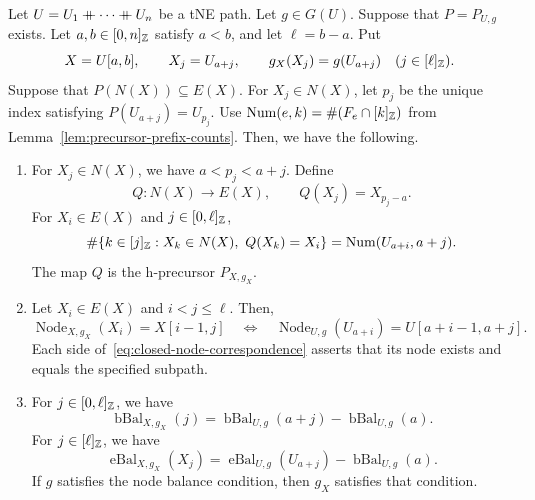 \begin{lemma}\label{lem:precursor-closed-restriction}
Let $U=U_1\mathbin{+\mkern-10mu+}\cdots\mathbin{+\mkern-10mu+} U_n$ be a tNE path. Let $g\in G(U)$. Suppose that
$P=P_{U,g}$ exists. Let $a,b\in[0,n]_{\mathbb Z}$ satisfy $a<b$, and let $\ell=b-a$. Put
\[
 X=U[a,b],\qquad X_j=U_{a+j},\qquad g_X(X_j)=g(U_{a+j})
 \quad(j\in[\ell]_{\mathbb Z}).
\]
Suppose that $P(N(X))\subseteq E(X)$.
For $X_j\in N(X)$, let $p_j$ be the unique index satisfying
$P(U_{a+j})=U_{p_j}$.
Use $\operatorname{Num}(e,k)=\#(F_e\cap[k]_{\mathbb Z})$ from Lemma~\ref{lem:precursor-prefix-counts}.
Then, we have the following.
\begin{enumerate}
\item\label{c:closed-prefix-count} For $X_j\in N(X)$, we have $a<p_j<a+j$.
Define
\[
 Q\colon N(X)\longrightarrow E(X),\qquad Q(X_j)=X_{p_j-a}.
\]
For $X_i\in E(X)$ and $j\in[0,\ell]_{\mathbb Z}$,
\[
 \#\{k\in[j]_{\Z}:X_k\in N(X),\ Q(X_k)=X_i\}=\operatorname{Num}(U_{a+i},a+j).
\]
The map $Q$ is the h-precursor $P_{X,g_X}$.
\item\label{c:closed-node-correspondence} Let $X_i\in E(X)$ and $i<j\le\ell$.
Then, \begin{equation}\label{eq:closed-node-correspondence}
 \operatorname{Node}_{X,g_X}(X_i)=X[i-1,j]
 \quad\Longleftrightarrow\quad
 \operatorname{Node}_{U,g}(U_{a+i})=U[a+i-1,a+j].
\end{equation}
Each side of~\eqref{eq:closed-node-correspondence} asserts that its node exists and equals the specified subpath.
\item\label{c:closed-balance} For $j\in[0,\ell]_{\mathbb Z}$, we have
\[
 \operatorname{bBal}_{X,g_X}(j)
 =\operatorname{bBal}_{U,g}(a+j)-\operatorname{bBal}_{U,g}(a).
\]
For $j\in[\ell]_{\mathbb Z}$, we have
\[
 \operatorname{eBal}_{X,g_X}(X_j)
 =\operatorname{eBal}_{U,g}(U_{a+j})-\operatorname{bBal}_{U,g}(a).
\]
If $g$ satisfies the node balance condition, then $g_X$ satisfies that condition.
\end{enumerate}
\end{lemma}
